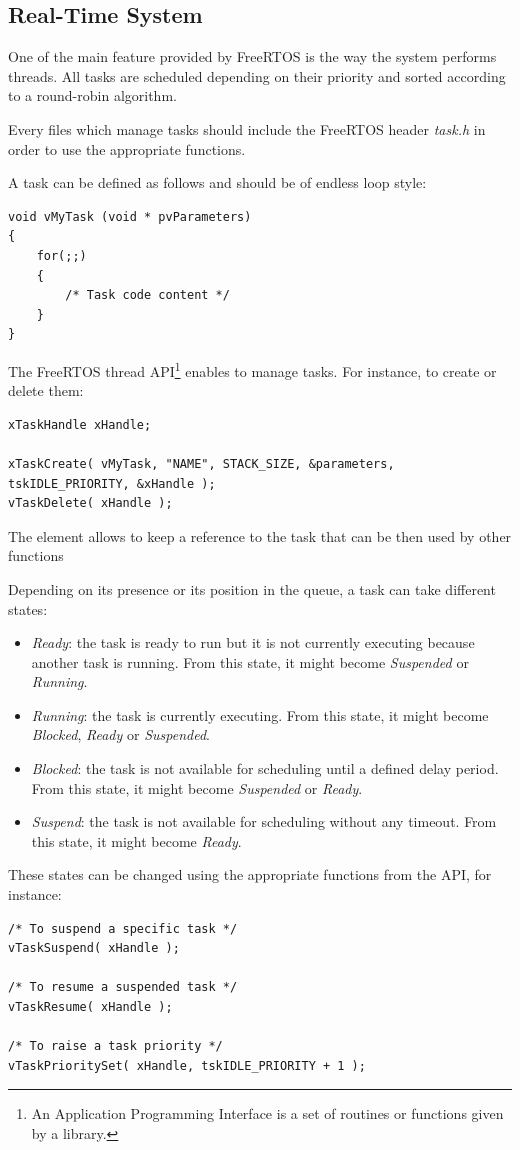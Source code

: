 \subsection{Real-Time System}

\hspace{15mm}One of the main feature provided by FreeRTOS is the way the system performs threads. All tasks are scheduled depending on their priority and sorted according to a round-robin algorithm.

Every files which manage tasks should include the FreeRTOS header \textit{task.h} in order to use the appropriate functions.

A task can be defined as follows and should be of endless loop style:\clearpage
\begin{lstlisting}
void vMyTask (void * pvParameters)
{
	for(;;)
	{
		/* Task code content */
	}
}
\end{lstlisting}

The FreeRTOS thread API\footnote{An Application Programming Interface is a set of routines or functions given by a library.} enables to manage tasks. For instance, to create or delete them:
\begin{lstlisting}
xTaskHandle xHandle;

xTaskCreate( vMyTask, "NAME", STACK_SIZE, &parameters, tskIDLE_PRIORITY, &xHandle );
vTaskDelete( xHandle );
\end{lstlisting}
The  element allows to keep a reference to the task that can be then used by other functions

Depending on its presence or its position in the queue, a task can take different states:
\begin{itemize}
\item \textit{Ready}: the task is ready to run but it is not currently executing because another task is running. From this state, it might become \textit{Suspended} or \textit{Running}.
\item \textit{Running}: the task is currently executing. From this state, it might become \textit{Blocked}, \textit{Ready} or \textit{Suspended}.
\item \textit{Blocked}: the task is not available for scheduling until a defined delay period. From this state, it might become \textit{Suspended} or \textit{Ready}.
\item \textit{Suspend}: the task is not available for scheduling without any timeout. From this state, it might become \textit{Ready}.
\end{itemize}
These states can be changed using the appropriate functions from the API, for instance:
\begin{lstlisting}
/* To suspend a specific task */
vTaskSuspend( xHandle );

/* To resume a suspended task */
vTaskResume( xHandle );

/* To raise a task priority */
vTaskPrioritySet( xHandle, tskIDLE_PRIORITY + 1 );
\end{lstlisting}


